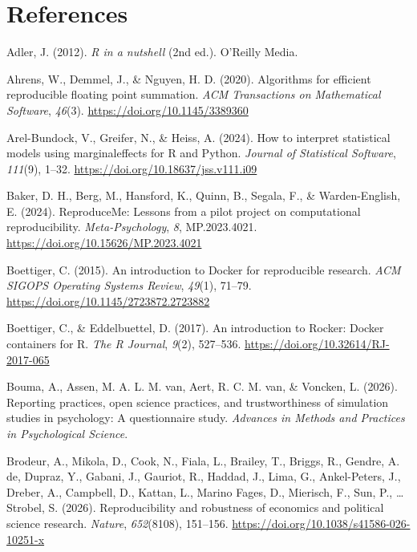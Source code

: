 \documentclass[
  man,
  longtable,
  nolmodern,
  notxfonts,
  notimes,
  colorlinks=true,linkcolor=blue,citecolor=blue,urlcolor=blue]{apa7}
\newlength{\cslhangindent}
\newenvironment{CSLReferences}[2] %
 {\begin{list}{}{%
  \setlength{\itemindent}{0pt}
  \setlength{\leftmargin}{0pt}
  \setlength{\parsep}{0pt}
  \ifodd #1
   \setlength{\leftmargin}{\cslhangindent}
   \setlength{\itemindent}{-1\cslhangindent}
  \fi
  \setlength{\itemsep}{#2\baselineskip}}}
 {\end{list}}
\begin{document}
\newpage{}

\section{References}\label{references}

\protect{}\label{refs}
\begin{CSLReferences}{1}{0}
Adler, J. (2012). \emph{R in a nutshell} (2nd ed.). O'Reilly Media.

Ahrens, W., Demmel, J., \& Nguyen, H. D. (2020). Algorithms for
efficient reproducible floating point summation. \emph{ACM Transactions
on Mathematical Software}, \emph{46}(3).
\url{https://doi.org/10.1145/3389360}

Arel-Bundock, V., Greifer, N., \& Heiss, A. (2024). How to interpret
statistical models using {marginaleffects} for {R} and {Python}.
\emph{Journal of Statistical Software}, \emph{111}(9), 1--32.
\url{https://doi.org/10.18637/jss.v111.i09}

Baker, D. H., Berg, M., Hansford, K., Quinn, B., Segala, F., \&
Warden-English, E. (2024). {ReproduceMe}: Lessons from a pilot project
on computational reproducibility. \emph{Meta-Psychology}, \emph{8},
MP.2023.4021. \url{https://doi.org/10.15626/MP.2023.4021}

Boettiger, C. (2015). An introduction to {Docker} for reproducible
research. \emph{ACM SIGOPS Operating Systems Review}, \emph{49}(1),
71--79. \url{https://doi.org/10.1145/2723872.2723882}

Boettiger, C., \& Eddelbuettel, D. (2017). An introduction to {Rocker}:
{Docker} containers for {R}. \emph{The R Journal}, \emph{9}(2),
527--536. \url{https://doi.org/10.32614/RJ-2017-065}

Bouma, A., Assen, M. A. L. M. van, Aert, R. C. M. van, \& Voncken, L.
(2026). Reporting practices, open science practices, and trustworthiness
of simulation studies in psychology: A questionnaire study.
\emph{Advances in Methods and Practices in Psychological Science}.

Brodeur, A., Mikola, D., Cook, N., Fiala, L., Brailey, T., Briggs, R.,
Gendre, A. de, Dupraz, Y., Gabani, J., Gauriot, R., Haddad, J., Lima,
G., Ankel-Peters, J., Dreber, A., Campbell, D., Kattan, L., Marino
Fages, D., Mierisch, F., Sun, P., \ldots{} Strobel, S. (2026).
Reproducibility and robustness of economics and political science
research. \emph{Nature}, \emph{652}(8108), 151--156.
\url{https://doi.org/10.1038/s41586-026-10251-x}


\end{CSLReferences}
\end{document}
